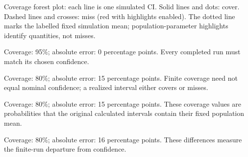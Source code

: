 \begin{minipage}[t]{.69\linewidth}
\begin{center}
\par\small Coverage forest plot: each line is one simulated $\mathrm{CI}$.
Solid lines and dots: cover. Dashed lines and crosses: miss (red with highlights enabled).
The dotted line marks the labelled fixed simulation mean; population-parameter highlights identify quantities, not misses.
\end{center}
\end{minipage}\par

\clearpage
{}
\begin{answeroptions}
\item Coverage: 95\%; absolute error: 0 percentage points. Every completed run must match its chosen confidence.
\item Coverage: 80\%; absolute error: 15 percentage points. Finite coverage need not equal nominal confidence; a realized interval either covers or misses.
\item Coverage: 80\%; absolute error: 15 percentage points. These coverage values are probabilities that the original calculated intervals contain their fixed population mean.
\item Coverage: 80\%; absolute error: 16 percentage points. These differences measure the finite-run departure from confidence.
\end{answeroptions}
\clearpage
